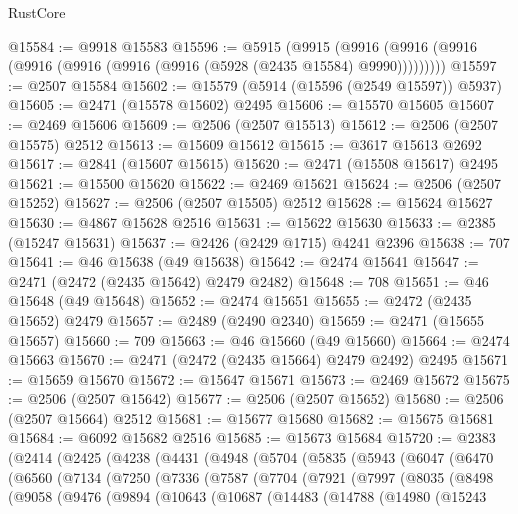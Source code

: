 \begin{lexlean}{RustCore}
\begin{coremodule}
@15584 := @9918 @15583
@15596 := @5915
    (@9915 (@9916 (@9916 (@9916 (@9916 (@9916 (@9916 (@9916 (@5928 (@2435 @15584) @9990)))))))))
@15597 := @2507 @15584
@15602 := @15579 (@5914 (@15596 (@2549 @15597)) @5937)
@15605 := @2471 (@15578 @15602) @2495
@15606 := @15570 @15605
@15607 := @2469 @15606
@15609 := @2506 (@2507 @15513)
@15612 := @2506 (@2507 @15575) @2512
@15613 := @15609 @15612
@15615 := @3617 @15613 @2692
@15617 := @2841 (@15607 @15615)
@15620 := @2471 (@15508 @15617) @2495
@15621 := @15500 @15620
@15622 := @2469 @15621
@15624 := @2506 (@2507 @15252)
@15627 := @2506 (@2507 @15505) @2512
@15628 := @15624 @15627
@15630 := @4867 @15628 @2516
@15631 := @15622 @15630
@15633 := @2385 (@15247 @15631)
@15637 := @2426 (@2429 @1715) @4241 @2396
@15638 := 707
@15641 := @46 @15638 (@49 @15638)
@15642 := @2474 @15641
@15647 := @2471 (@2472 (@2435 @15642) @2479 @2482)
@15648 := 708
@15651 := @46 @15648 (@49 @15648)
@15652 := @2474 @15651
@15655 := @2472 (@2435 @15652) @2479
@15657 := @2489 (@2490 @2340)
@15659 := @2471 (@15655 @15657)
@15660 := 709
@15663 := @46 @15660 (@49 @15660)
@15664 := @2474 @15663
@15670 := @2471 (@2472 (@2435 @15664) @2479 @2492) @2495
@15671 := @15659 @15670
@15672 := @15647 @15671
@15673 := @2469 @15672
@15675 := @2506 (@2507 @15642)
@15677 := @2506 (@2507 @15652)
@15680 := @2506 (@2507 @15664) @2512
@15681 := @15677 @15680
@15682 := @15675 @15681
@15684 := @6092 @15682 @2516
@15685 := @15673 @15684
@15720 := @2383
    (@2414
      (@2425
        (@4238
          (@4431
            (@4948
              (@5704
                (@5835
                  (@5943
                    (@6047
                      (@6470
                        (@6560
                          (@7134
                            (@7250
                              (@7336
                                (@7587
                                  (@7704
                                    (@7921
                                      (@7997
                                        (@8035
                                          (@8498
                                            (@9058
                                              (@9476
                                                (@9894
                                                  (@10643
                                                    (@10687
                                                      (@14483
                                                        (@14788
                                                          (@14980
                                                            (@15243

\end{coremodule}
\end{lexlean}
